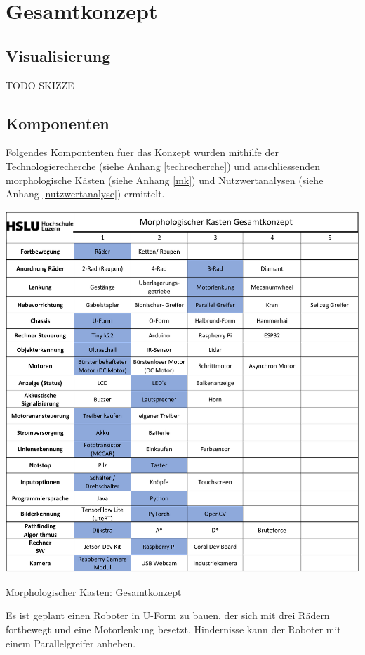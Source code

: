 \section{Gesamtkonzept}

\subsection{Visualisierung}

TODO SKIZZE


\subsection{Komponenten}

Folgendes Kompontenten fuer das Konzept wurden mithilfe der Technologierecherche (siehe Anhang \ref{techrecherche}) und anschliessenden morphologische Kästen (siehe Anhang \ref{mk}) und Nutzwertanalysen (siehe Anhang \ref{nutzwertanalyse}) ermittelt. 

\begin{table}[H]
\centering
\includegraphics[width=\textwidth -20mm]{assets/MK-all.pdf}
\caption{Morphologischer Kasten: Gesamtkonzept}
\label{table:mk-all}
\end{table}

Es ist geplant einen Roboter in U-Form zu bauen, der sich mit drei Rädern fortbewegt und eine Motorlenkung besetzt. Hindernisse kann der Roboter mit einem Parallelgreifer anheben.

